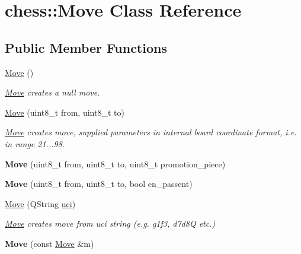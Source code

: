 \hypertarget{classchess_1_1Move}{\section{chess\-:\-:Move Class Reference}
\label{classchess_1_1Move}
}
\subsection*{Public Member Functions}
\begin{DoxyCompactItemize}
\item 
\hypertarget{classchess_1_1Move_a72979236310a7c8638ce163d8a140341}{\hyperlink{classchess_1_1Move_a72979236310a7c8638ce163d8a140341}{Move} ()}\label{classchess_1_1Move_a72979236310a7c8638ce163d8a140341}

\begin{DoxyCompactList}\small\item\em \hyperlink{classchess_1_1Move}{Move} creates a null move. \end{DoxyCompactList}\item 
\hyperlink{classchess_1_1Move_ae9a0a49737f36d5bcc6f0a80e7b6ae99}{Move} (uint8\-\_\-t from, uint8\-\_\-t to)
\begin{DoxyCompactList}\small\item\em \hyperlink{classchess_1_1Move}{Move} creates move, supplied parameters in internal board coordinate format, i.\-e. in range 21...98. \end{DoxyCompactList}\item 
\hypertarget{classchess_1_1Move_a1298f3f0cd28e307cd79ffe0555f890c}{{\bfseries Move} (uint8\-\_\-t from, uint8\-\_\-t to, uint8\-\_\-t promotion\-\_\-piece)}\label{classchess_1_1Move_a1298f3f0cd28e307cd79ffe0555f890c}

\item 
\hypertarget{classchess_1_1Move_aa1a208ecf98dc32c4dfa1b585d640045}{{\bfseries Move} (uint8\-\_\-t from, uint8\-\_\-t to, bool en\-\_\-passent)}\label{classchess_1_1Move_aa1a208ecf98dc32c4dfa1b585d640045}

\item 
\hyperlink{classchess_1_1Move_a46cebe775f30d4a02fbbcfbf1d1547ec}{Move} (Q\-String \hyperlink{classchess_1_1Move_a808b107f197231153d98d10251d9096e}{uci})
\begin{DoxyCompactList}\small\item\em \hyperlink{classchess_1_1Move}{Move} creates move from uci string (e.\-g. g1f3, d7d8\-Q etc.) \end{DoxyCompactList}\item 
\hypertarget{classchess_1_1Move_a0be2b00f7d600057abd837af8e733bd9}{{\bfseries Move} (const \hyperlink{classchess_1_1Move}{Move} \&m)}\label{classchess_1_1Move_a0be2b00f7d600057abd837af8e733bd9}


\end{DoxyCompactItemize}
